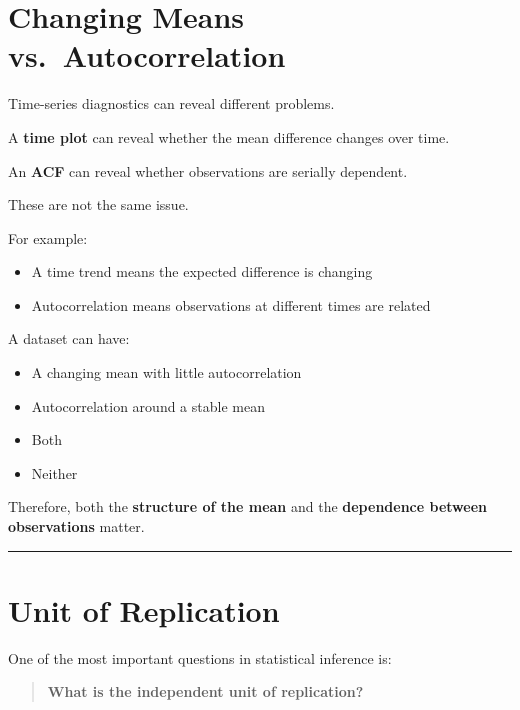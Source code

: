 \documentclass[
  letterpaper,
  DIV=11,
  numbers=noendperiod]{scrreprt}
\providecommand{\tightlist}{%
  \setlength{\itemsep}{0pt}\setlength{\parskip}{0pt}}
\begin{document}

\chapter{Changing Means
vs.~Autocorrelation}\label{changing-means-vs.-autocorrelation}

Time-series diagnostics can reveal different problems.

A \textbf{time plot} can reveal whether the mean difference changes over
time.

An \textbf{ACF} can reveal whether observations are serially dependent.

These are not the same issue.

For example:

\begin{itemize}
\tightlist
\item
  A time trend means the expected difference is changing
\item
  Autocorrelation means observations at different times are related
\end{itemize}

A dataset can have:

\begin{itemize}
\tightlist
\item
  A changing mean with little autocorrelation
\item
  Autocorrelation around a stable mean
\item
  Both
\item
  Neither
\end{itemize}

Therefore, both the \textbf{structure of the mean} and the
\textbf{dependence between observations} matter.

\begin{center}\rule{0.5\linewidth}{0.5pt}\end{center}


\chapter{Unit of Replication}\label{unit-of-replication}

One of the most important questions in statistical inference is:

\begin{quote}
\textbf{What is the independent unit of replication?}
\end{quote}
\end{document}
